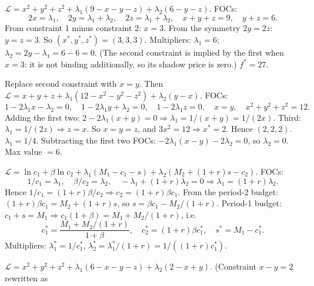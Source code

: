 \begin{solutions}
  \item $\mathcal{L} = x^2 + y^2 + z^2 + \lambda_1(9 - x - y - z)
        + \lambda_2(6 - y - z)$. FOCs:
        \[
        2 x = \lambda_1, \quad 2 y = \lambda_1 + \lambda_2, \quad
        2 z = \lambda_1 + \lambda_2, \quad x + y + z = 9, \quad
        y + z = 6.
        \]
        From constraint 1 minus constraint 2: $x = 3$. From the symmetry
        $2 y = 2 z$: $y = z = 3$. So $(x^*, y^*, z^*) = (3, 3, 3)$.
        Multipliers: $\lambda_1 = 6$;
        $\lambda_2 = 2 y - \lambda_1 = 6 - 6 = 0$. (The second constraint
        is implied by the first when $x = 3$: it is not binding
        additionally, so its shadow price is zero.) $f^* = 27$.
  \item Replace second constraint with $x = y$. Then
        $\mathcal{L} = x + y + z + \lambda_1(12 - x^2 - y^2 - z^2)
        + \lambda_2(y - x)$. FOCs:
        \[
        1 - 2 \lambda_1 x - \lambda_2 = 0, \quad
        1 - 2 \lambda_1 y + \lambda_2 = 0, \quad
        1 - 2 \lambda_1 z = 0, \quad x = y, \quad
        x^2 + y^2 + z^2 = 12.
        \]
        Adding the first two:
        $2 - 2 \lambda_1(x + y) = 0 \Rightarrow \lambda_1 = 1/(x + y)
        = 1/(2 x)$. Third: $\lambda_1 = 1/(2 z) \Rightarrow z = x$. So
        $x = y = z$, and $3 x^2 = 12 \Rightarrow x^* = 2$. Hence
        $(2, 2, 2)$. $\lambda_1 = 1/4$. Subtracting the first two FOCs:
        $-2 \lambda_1(x - y) - 2 \lambda_2 = 0$, so $\lambda_2 = 0$. Max
        value $= 6$.
  \item $\mathcal{L} = \ln c_1 + \beta \ln c_2
        + \lambda_1(M_1 - c_1 - s)
        + \lambda_2(M_2 + (1 + r) s - c_2)$. FOCs:
        \[
        1/c_1 = \lambda_1, \quad \beta/c_2 = \lambda_2, \quad
        -\lambda_1 + (1 + r) \lambda_2 = 0 \Rightarrow
        \lambda_1 = (1 + r) \lambda_2.
        \]
        Hence $1/c_1 = (1 + r) \beta / c_2 \Rightarrow
        c_2 = (1 + r) \beta c_1$. From the period-2 budget:
        $(1 + r) \beta c_1 = M_2 + (1 + r) s$, so
        $s = \beta c_1 - M_2/(1 + r)$. Period-1 budget:
        $c_1 + s = M_1 \Rightarrow c_1(1 + \beta) = M_1 + M_2/(1 + r)$,
        i.e.
        \[
        c_1^* = \frac{M_1 + M_2/(1 + r)}{1 + \beta}, \quad
        c_2^* = (1 + r) \beta c_1^*, \quad s^* = M_1 - c_1^*.
        \]
        Multipliers: $\lambda_1^* = 1/c_1^*$,
        $\lambda_2^* = \lambda_1^*/(1 + r) = 1/((1 + r) c_1^*)$.
  \item $\mathcal{L} = x^2 + y^2 + z^2 + \lambda_1(6 - x - y - z)
        + \lambda_2(2 - x + y)$. (Constraint $x - y = 2$ rewritten as

\end{solutions}

